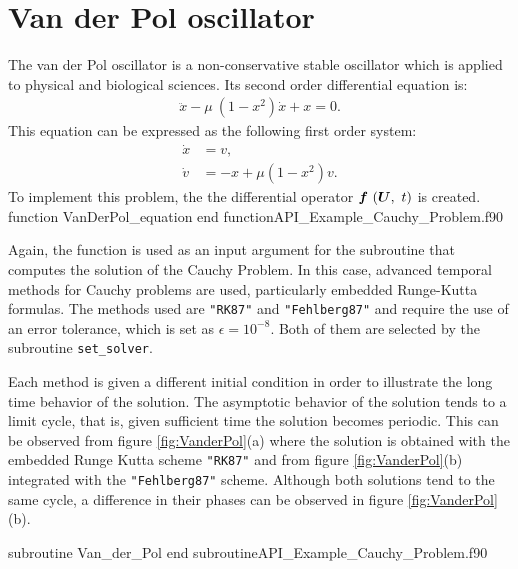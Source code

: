  
 
  
                
  \newpage 
   \section{Van der Pol oscillator}
   The van der Pol oscillator is a non-conservative stable oscillator which is applied to physical and biological sciences. Its  second order differential equation is:
  \begin{align*}
      \ddot x - \mu \ ( 1 - x^2) \dot x + x = 0.
  \end{align*}
  This equation can be expressed as the following first order system: 
  \begin{align*}
      \dot{x} & = v, \\
      \dot{v} & = - x + \mu \left(1-x^2\right) v.
  \end{align*}
  To implement this problem, the 
  the differential operator $ \vect{f}\ (\vect{U},\ t) $ is created.
  \vspace{0.5cm} 
  {function VanDerPol_equation}
  {end function}{API_Example_Cauchy_Problem.f90}
  
  Again, the function is used as an input argument for the subroutine that computes the solution of the Cauchy Problem. In this case, advanced temporal methods for Cauchy problems are used, particularly embedded Runge-Kutta formulas. The methods used are \verb|"RK87"| and \verb|"Fehlberg87"| and require the use of an error tolerance, which is set as $\epsilon=10^{-8}$. Both of them are selected by the subroutine \verb|set_solver|.
  
  Each method is given a different initial condition in order to illustrate the long time behavior of the solution. The asymptotic behavior of the solution tends to a limit cycle, that is, given sufficient time the solution becomes periodic. This can be observed from figure \ref{fig:VanderPol}(a) where the solution is obtained with the embedded Runge Kutta  scheme \verb|"RK87"| and from figure \ref{fig:VanderPol}(b) integrated with the \verb|"Fehlberg87"| scheme. Although both solutions tend to the same cycle,  a difference in their phases can be observed in figure \ref{fig:VanderPol}(b).
  
  \newpage
  \vspace{0.5cm} 
  {subroutine Van_der_Pol}
  {end subroutine}{API_Example_Cauchy_Problem.f90} 
  
